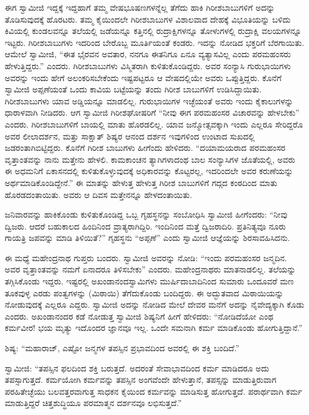  ಈಗ ಸ್ವಾಮೀಜಿ ಇದ್ದಕ್ಕೆ ಇದ್ದಹಾಗೆ ತಮ್ಮ ವೇಷಭೂಷಣಗಳನ್ನೆಲ್ಲ ತೆಗೆದು ಹಾಕಿ ಗಿರೀಶಬಾಬುಗಳಿಗೆ ಅದನ್ನು ತೊಡಿಸುವುದಕ್ಕೆ ಹೊರಟರು. ತಮ್ಮ ಕೈಯಿಂದಲೇ ಗಿರೀಶಬಾಬುಗಳ ವಿಶಾಲವಾದ ದೇಹಕ್ಕೆ ವಿಭೂತಿಯನ್ನು ಬಳಿದು ಕಿವಿಯಲ್ಲಿ ಕುಂಡಲವನ್ನೂ ತಲೆಯಲ್ಲಿ ಜಡೆಯನ್ನೂ ಕತ್ತಿನಲ್ಲಿ ರುದ್ರಾಕ್ಷಿಗಳನ್ನೂ ತೋಳುಗಳಲ್ಲಿ ರುದ್ರಾಕ್ಷಿ ವಲಯಗಳನ್ನೂ ಇಟ್ಟರು. ಗಿರೀಶಬಾಬುಗಳು ಇದರಿಂದ ಬೇರೊಬ್ಬ ಮೂರ್ತಿಯಂತೆ ಕಂಡರು. ಇದನ್ನು ನೋಡಿದ ಭಕ್ತರಿಗೆ ಬೆರಗಾಯಿತು. ಆಮೇಲೆ ಸ್ವಾಮೀಜಿ, “ಈತ ಭೈರವನ ಅವತಾರ, ನನಗೂ ಈತನಿಗೂ ಏನೂ ವ್ಯತ್ಯಾಸವಿಲ್ಲ ಎಂದು ಪರಮಹಂಸರು ಹೇಳುತ್ತಿದ್ದರು.” ಎಂದರು. ಗಿರೀಶಬಾಬುಗಳು ವಿಸ್ಮಿತರಾಗಿ ಕುಳಿತುಕೊಂಡಿದ್ದರು. ಅವರ ಸಂನ್ಯಾಸಿ ಗುರುಭಾಯಿಗಳು ಅವರನ್ನು ಇಂದು ಹೇಗೆ ಅಲಂಕರಿಸಬೇಕೆಂದು ಇಷ್ಟಪಟ್ಟರೂ ಆ ವೇಷದಲ್ಲಿಯೇ ಅವರು ಒಪ್ಪುತ್ತಿದ್ದರು. ಕೊನೆಗೆ ಸ್ವಾಮೀಜಿ ಅಪ್ಪಣೆಯಂತೆ ಒಂದು ಕಾವಿಯ ಬಟ್ಟೆಯನ್ನು ತಂದು ಗಿರೀಶ ಬಾಬುಗಳಿಗೆ ಉಡಿಸಿದ್ದಾಯಿತು. ಗಿರೀಶಬಾಬುಗಳು ಯಾವ ಅಡ್ಡಿಯನ್ನೂ ಮಾಡಲಿಲ್ಲ. ಗುರುಭಾಯಿಗಳ ಇಚ್ಛೆಯಂತೆ ಅವರು ಇಂದು ಕೈಕಾಲುಗಳನ್ನು ಧಾರಾಳವಾಗಿ ನೀಡಿದರು. ಆಗ ಸ್ವಾಮೀಜಿ ಗಿರೀಶಘೋಷರಿಗೆ “ನೀವು ಈಗ ಪರಮಹಂಸರ ವಿಚಾರವನ್ನು ಹೇಳಬೇಕು” ಎಂದರು. ಗಿರೀಶಬಾಬುಗಳಿಗೆ ಬಾಯಲ್ಲಿ ಮಾತು ಹೊರಡಲಿಲ್ಲ. ಯಾವ ಜನ್ಮೋತ್ಸವಕ್ಕಾಗಿ ಇಂದು ಎಲ್ಲರೂ ಸೇರಿದ್ದರೊ ಅವರ ಲೀಲಾದರ್ಶನ, ಮತ್ತು ಸಾಕ್ಷಾತ್ ಶಿಷ್ಯರ ಆನಂದ ದರ್ಶನ ಇವುಗಳಿಂದ ಉಂಟಾದ ಸುಖದಲ್ಲಿ ಜಡರಂತಾಗಿಬಿಟ್ಟಿದ್ದರು. ಕೊನೆಗೆ ಗಿರೀಶ ಬಾಬುಗಳು ಹೀಗೆಂದು ಹೇಳಿದರು. “ದಯಾಮಯರಾದ ಪರಮಹಂಸರ ವೃತ್ತಾಂತವನ್ನು ನಾನು ಮತ್ತೇನು ಹೇಳಲಿ. ಕಾಮಕಾಂಚನ ತ್ಯಾಗಿಗಳಾದಂಥ ಬಾಲ ಸಂನ್ಯಾಸಿಗಳ ಜೊತೆಯಲ್ಲಿ, ಅವರು ಈ ಅಧಮನಿಗೆ ಏಕಾಸನದಲ್ಲಿ ಕುಳಿತುಕೊಳ್ಳುವುದಕ್ಕೆ ಅಧಿಕಾರವನ್ನು ಕೊಟ್ಟರಲ್ಲ, ಇದರಿಂದಲೇ ಅವರ ಕರುಣೆಯನ್ನು ಅರ್ಥಮಾಡಿಕೊಂಡಿದ್ದೇನೆ.” ಈ ಮಾತನ್ನು ಹೇಳುತ್ತ ಹೇಳುತ್ತ ಗಿರೀಶ ಬಾಬುಗಳಿಗೆ ಗದ್ಗದ ಕಂಠದಿಂದ ಮಾತು ಹೊರಡದಂತಾಯಿತು. ಅವರು ಆ ದಿವಸ ಮತ್ತೇನನ್ನೂ ಹೇಳದಂತಾಯಿತು. 

 ಜನಿವಾರವನ್ನು ಹಾಕಿಕೊಂಡು ಕುಳಿತುಕೊಂಡಿದ್ದ ಒಬ್ಬ ಗೃಹಸ್ಥನನ್ನು ಸಂಬೋಧಿಸಿ ಸ್ವಾಮೀಜಿ ಹೀಗೆಂದರು: “ನೀವು ದ್ವಿಜರು. ಆದರೆ ಬಹುಕಾಲದ ಹಿಂದಿನಿಂದ ವ್ರಾತ್ಯರಾಗಿದ್ದಿರಿ. ಇಂದಿನಿಂದ ಮತ್ತೆ ದ್ವಿಜರಾದಿರಿ. ಪ್ರತಿನಿತ್ಯವೂ ನೂರು ಗಾಯತ್ರಿ ಜಪವನ್ನು ಮಾಡಿ ತಿಳಿಯಿತೆ?” ಗೃಹಸ್ಥನು “ಅಪ್ಪಣೆ” ಎಂದು ಸ್ವಾಮೀಜಿ ಆಜ್ಞೆಯನ್ನು ಶಿರಸಾವಹಿಸಿದನು. 

 ಈ ಮಧ್ಯೆ ಮಹೇಂದ್ರನಾಥ ಗುಪ್ತರು ಬಂದರು. ಸ್ವಾಮೀಜಿ ಅವರನ್ನು ನೋಡಿ: “ಇಂದು ಪರಮಹಂಸರ ಜನ್ಮದಿನ. ಅವರ ವೃತ್ತಾಂತವನ್ನು ನಮಗೆ ಏನಾದರೂ ತಿಳಿಸಬೇಕು” ಎಂದರು. ಮಹೇಂದ್ರನಾಥರು ಮಾತನಾಡಲಿಲ್ಲ. ತಲೆಯನ್ನು ತಗ್ಗಿಸಿಕೊಂಡು ಇದ್ದರು. ಇಷ್ಟರಲ್ಲಿ ಅಖಂಡಾನಂದಸ್ವಾಮಿಗಳು ಮುರ್ಷಿದಾಬಾದಿನಿಂದ ಸುಮಾರು ಒಂದೂವರೆ ಮಣ ತೂಕವುಳ್ಳ ಎರಡು ಪಂತ್ವಗಳನ್ನು (ಮಿಠಾಯಿ) ತೆಗೆದುಕೊಂಡು ಬಂದಿದ್ದರು. ಈ ಅದ್ಭುತವಾದ ಮಿಠಾಯಿಯನ್ನು ನೋಡುವುದಕ್ಕೆ ಎಲ್ಲರೂ ಎದ್ದರು. ಸ್ವಾಮೀಜಿ ಅದನ್ನು ನೋಡಿದ ಮೇಲೆ ದೇವರ ಮನೆಗೆ ಅದನ್ನು ನೈವೇದ್ಯಕ್ಕಾಗಿ ಕೊಡು ಎಂದರು. ಅಖಂಡಾನಂದರ ಕಡೆ ನೋಡುತ್ತ ಸ್ವಾಮೀಜಿ ಶಿಷ್ಯನಿಗೆ ಹೀಗೆ ಹೇಳಿದರು: “ನೋಡಿದೆಯೋ ಎಂಥ ಕರ್ಮವೀರ! ಭಯ ಮೃತ್ಯು ಇದೊಂದರ ಜ್ಞಾನವೂ ಇಲ್ಲ. ಒಂದೇ ಸಮನಾಗಿ ಕರ್ಮ ಮಾಡಿಕೊಂಡು ಹೋಗುತ್ತಿದ್ದಾನೆ.” 

 ಶಿಷ್ಯ: “ಮಹಾರಾಜ್, ಎಷ್ಟೋ ಜನ್ಮಗಳ ತಪಸ್ಸಿನ ಪ್ರಭಾವದಿಂದ ಅವರಲ್ಲಿ ಈ ಶಕ್ತಿ ಬಂದಿದೆ.” 

 ಸ್ವಾಮೀಜಿ: “ತಪಸ್ಸಿನ ಫಲದಿಂದ ಶಕ್ತಿ ಬರುತ್ತದೆ. ಅದರಂತೆ ಸೇವಾಭಾವದಿಂದ ಕರ್ಮ ಮಾಡಿದರೂ ಅದು ತಪಸ್ಸಾಗುತ್ತದೆ. ಕರ್ಮಯೋಗಿ ಕರ್ಮವನ್ನು ತಪಸ್ಸಿನ ಅಂಗವೆಂದೇ ಹೇಳುತ್ತಾನೆ, ತಪಸ್ಸನ್ನು ಮಾಡುತ್ತಿರುವಾಗ ಪರಹಿತೇಚ್ಛೆಯು ಬಲವತ್ತರವಾಗುತ್ತ ಸಾಧಕನ ಕೈಯಿಂದ ಕರ್ಮವನ್ನು ಮಾಡಿಸುತ್ತ ಹೋಗುತ್ತದೆ. ಪರಾರ್ಥವಾಗಿ ಕರ್ಮ ಮಾಡುತ್ತಿದ್ದರೆ ಚಿತ್ತಶುದ್ಧಿಯೂ ಪರಮಾತ್ಮನ ದರ್ಶನವೂ ಲಭಿಸುತ್ತದೆ.” 

